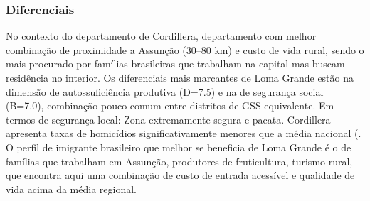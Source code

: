 \subsubsection*{Diferenciais}\label{dif-loma-grande-0311}
No contexto do departamento de Cordillera, departamento com melhor combinação de proximidade a Assunção (30–80 km) e custo de vida rural, sendo o mais procurado por famílias brasileiras que trabalham na capital mas buscam residência no interior. Os diferenciais mais marcantes de Loma Grande estão na dimensão de autossuficiência produtiva (D=7.5) e na de segurança social (B=7.0), combinação pouco comum entre distritos de GSS equivalente. Em termos de segurança local: Zona extremamente segura e pacata. Cordillera apresenta taxas de homicídios significativamente menores que a média nacional (. O perfil de imigrante brasileiro que melhor se beneficia de Loma Grande é o de famílias que trabalham em Assunção, produtores de fruticultura, turismo rural, que encontra aqui uma combinação de custo de entrada acessível e qualidade de vida acima da média regional.
